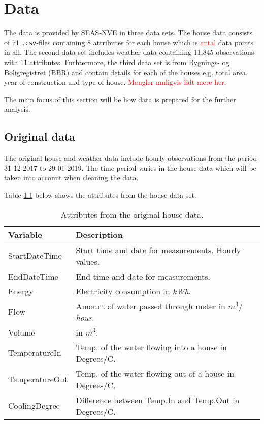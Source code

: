 \chapter{Data}
The data is provided by SEAS-NVE in three data sets. The house data consists of 71 \texttt{.csv}-files containing 8 attributes for each house which is \textcolor{red}{antal} data points in all. The second data set includes weather data containing 11,845 observations with 11 attributes. Furhtermore, the third data set is from Bygnings- og Boligregistret (BBR) and contain details for each of the houses e.g. total area, year of construction and type of house. \textcolor{red}{Mangler muligvis lidt mere her.}

\noindent The main focus of this section will be how data is prepared for the further analysis. 

\section{Original data}
The original house and weather data include hourly observations from the period 31-12-2017 to 29-01-2019. The time period varies in the house data which will be taken into account when cleaning the data. 

Table \ref{tab: housedata} below shows the attributes from the house data set. 
\begin{table}[H]
    \centering
    \begin{tabular}{ll}
     \hline
     \textbf{Variable} & \textbf{Description} \\
    \hline
    \hline
    StartDateTime  &  Start time and date for measurements. Hourly values.\\
    EndDateTime  &  End time and date for measurements.\\
    Energy  &  Electricity consumption in \textit{kWh}.\\
    Flow  &  Amount of water passed through meter in \textit{$m^3/$hour}.\\
    Volume & in $m^3$.\\
    TemperatureIn  &  Temp. of the water flowing into a house in Degrees/C. \\
    TemperatureOut  & Temp. of the water flowing out of a house in Degrees/C.\\
    CoolingDegree  &  Difference between Temp.In and Temp.Out in Degrees/C. \\
    \hline
    \end{tabular}
    \caption{Attributes from the original house data.}
    \label{tab: housedata}
\end{table}

